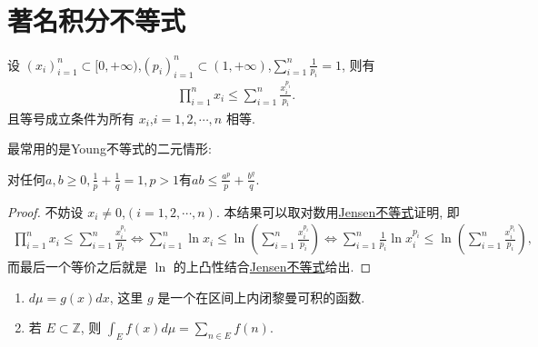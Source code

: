 \documentclass[../../main.tex]{subfiles}
\begin{document}
\section{著名积分不等式}

\begin{theorem}[Young不等式初等形式]\label{theorem:Young不等式初等形式}
设 $(x_i)_{i = 1}^n \subset [0, +\infty)$,$(p_i)_{i = 1}^n \subset (1, +\infty)$,$\sum_{i = 1}^n \frac{1}{p_i} = 1$, 则有
\begin{align*}
\prod_{i = 1}^n x_i \leqslant \sum_{i = 1}^n \frac{x_i^{p_i}}{p_i}.
\end{align*}
且等号成立条件为所有 $x_i$,$i = 1,2,\cdots,n$ 相等.
\end{theorem}
\begin{note}
最常用的是Young不等式的二元情形:

对任何$a,b\geq0,\frac{1}{p}+\frac{1}{q}=1,p>1$有$ab\leqslant \frac{a^p}{p}+\frac{b^q}{q}.$
\end{note}
\begin{proof}
不妨设 $x_i \neq 0$,$(i = 1,2,\cdots,n)$. 本结果可以取对数用\hyperref[theorem:Jensen不等式1111]{Jensen不等式}证明, 即
\begin{align*}
\prod_{i = 1}^n x_i \leqslant \sum_{i = 1}^n \frac{x_i^{p_i}}{p_i}\Leftrightarrow \sum_{i = 1}^n \ln x_i \leqslant \ln \left(\sum_{i = 1}^n \frac{x_i^{p_i}}{p_i}\right) \Leftrightarrow \sum_{i = 1}^n \frac{1}{p_i} \ln x_i^{p_i} \leqslant \ln \left(\sum_{i = 1}^n \frac{x_i^{p_i}}{p_i}\right),
\end{align*}
而最后一个等价之后就是 $\ln$ 的上凸性结合\hyperref[theorem:Jensen不等式1111]{Jensen不等式}给出.
\end{proof}

\begin{definition}
\begin{enumerate}[(1)]
\item $d\mu = g(x)dx$, 这里 $g$ 是一个在区间上内闭黎曼可积的函数.
\item 若 $E \subset \mathbb{Z}$, 则 $\int_E f(x) d\mu = \sum_{n \in E} f(n)$.
\end{enumerate}
\end{definition}
\end{document}
